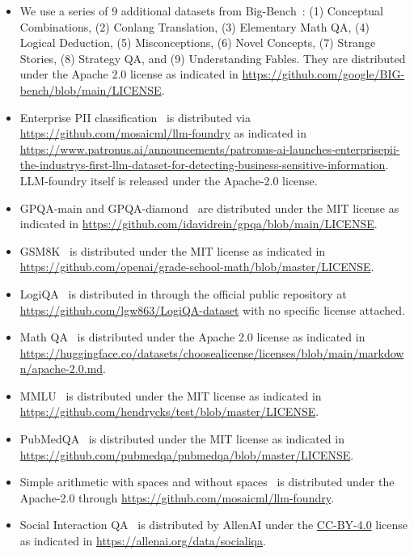 \documentclass{article}
\begin{document}
\begin{itemize}
    BBQ~\citep{bbq} is distributed under the CC-By-4 license as indicated in \url{https://github.com/nyu-mll/BBQ/blob/main/LICENSE}.
    \item
    We use a series of 9 additional datasets from Big-Bench~\citep{srivastava2023beyond}: (1) Conceptual Combinations, (2) Conlang Translation, (3) Elementary Math QA, (4) Logical Deduction, (5) Misconceptions, (6) Novel Concepts, (7) Strange Stories, (8) Strategy QA, and (9) Understanding Fables. They are distributed under the Apache 2.0 license as indicated in \url{https://github.com/google/BIG-bench/blob/main/LICENSE}.
    \item
    Enterprise PII classification~\citep{patronusPatronusPatronus} is distributed via \url{https://github.com/mosaicml/llm-foundry} as indicated in \url{https://www.patronus.ai/announcements/patronus-ai-launches-enterprisepii-the-industrys-first-llm-dataset-for-detecting-business-sensitive-information}. LLM-foundry itself is released under the Apache-2.0 license.
    \item
    GPQA-main and GPQA-diamond~\citep{rein2023gpqa} are distributed under the MIT license as indicated in \url{https://github.com/idavidrein/gpqa/blob/main/LICENSE}.
    \item
    GSM8K~\citep{gsm8k} is distributed under the MIT license as indicated in \url{https://github.com/openai/grade-school-math/blob/master/LICENSE}.
    \item
    LogiQA~\citep{Liu2020LogiQAAC}  is distributed in through the official public repository at \url{https://github.com/lgw863/LogiQA-dataset} with no specific license attached.
    \item
    Math QA~\citep{mathqa}  is distributed under the Apache 2.0 license as indicated in \url{https://huggingface.co/datasets/choosealicense/licenses/blob/main/markdown/apache-2.0.md}.
    \item
    MMLU~\citep{mmlu} is distributed under the MIT license as indicated in \url{https://github.com/hendrycks/test/blob/master/LICENSE}.
    \item
    PubMedQA~\citep{pubmed} is distributed under the MIT license as indicated in \url{https://github.com/pubmedqa/pubmedqa/blob/master/LICENSE}.
    \item
    Simple arithmetic with spaces and without spaces~\citep{mosailMLarithmetic} is distributed under the Apache-2.0 through \url{https://github.com/mosaicml/llm-foundry}.
    \item
    Social Interaction QA~\citep{siqa} is distributed by AllenAI under the \href{https://creativecommons.org/licenses/by/4.0/}{CC-BY-4.0} license as indicated in \url{https://allenai.org/data/socialiqa}.

\end{itemize}
\end{document}
